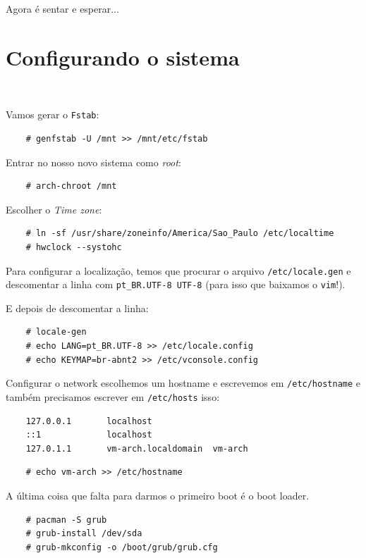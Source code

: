 \documentclass{article}
\begin{document}
Agora é sentar e esperar...

\section{Configurando o sistema}\

Vamos gerar o \texttt{Fstab}:

\begin{verbatim}
    # genfstab -U /mnt >> /mnt/etc/fstab
\end{verbatim}

Entrar no nosso novo sistema como \emph{root}:

\begin{verbatim}
    # arch-chroot /mnt
\end{verbatim}

Escolher o \emph{Time zone}:

\begin{verbatim}
    # ln -sf /usr/share/zoneinfo/America/Sao_Paulo /etc/localtime
    # hwclock --systohc
\end{verbatim}

Para configurar a localização,
temos que procurar o arquivo \texttt{/etc/locale.gen}
e descomentar a linha com \texttt{pt\_BR.UTF-8 UTF-8}
(para isso que baixamos o \texttt{vim}!).

E depois de descomentar a linha:

\begin{verbatim}
    # locale-gen
    # echo LANG=pt_BR.UTF-8 >> /etc/locale.config
    # echo KEYMAP=br-abnt2 >> /etc/vconsole.config
\end{verbatim}

Configurar o network escolhemos um hostname
e escrevemos em \texttt{/etc/hostname}
e também precisamos escrever em \texttt{/etc/hosts} isso: \\
\begin{verbatim}
    127.0.0.1       localhost
    ::1             localhost
    127.0.1.1       vm-arch.localdomain  vm-arch
\end{verbatim}

\begin{verbatim}
    # echo vm-arch >> /etc/hostname
\end{verbatim}

A última coisa que falta para darmos o primeiro boot
é o boot loader.

\begin{verbatim}
    # pacman -S grub
    # grub-install /dev/sda
    # grub-mkconfig -o /boot/grub/grub.cfg
\end{verbatim}
\end{document}

